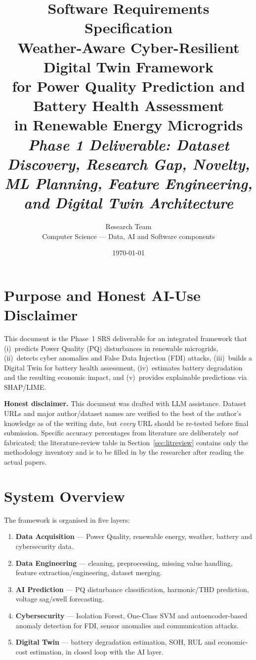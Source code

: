 \documentclass[11pt,a4paper]{article}
\title{
    \vspace{-2em}
    \textbf{Software Requirements Specification}\\[0.4em]
    \Large Weather-Aware Cyber-Resilient Digital Twin Framework\\
    \Large for Power Quality Prediction and Battery Health Assessment\\
    \Large in Renewable Energy Microgrids\\[0.6em]
    \normalsize \textit{Phase 1 Deliverable: Dataset Discovery, Research Gap,
    Novelty, ML Planning, Feature Engineering, and Digital Twin Architecture}
}
\author{Research Team \\ \small Computer Science --- Data, AI and Software components}
\date{\today}
\begin{document}
\maketitle

\section{Purpose and Honest AI-Use Disclaimer}

This document is the Phase~1 SRS deliverable for an integrated framework that
(i)~predicts Power Quality (PQ) disturbances in renewable microgrids,
(ii)~detects cyber anomalies and False Data Injection (FDI) attacks,
(iii)~builds a Digital Twin for battery health assessment,
(iv)~estimates battery degradation and the resulting economic impact, and
(v)~provides explainable predictions via SHAP/LIME.

\begin{tcolorbox}[colback=warnboxbg,colframe=warnboxbd,sharp corners,
boxrule=0.6pt,left=8pt,right=8pt,top=6pt,bottom=6pt]
\textbf{Honest disclaimer.} This document was drafted with LLM assistance.
Dataset URLs and major author/dataset names are verified to the best of the
author's knowledge as of the writing date, but \emph{every} URL should be
re-tested before final submission. Specific accuracy percentages from
literature are deliberately \emph{not} fabricated; the literature-review
table in Section~\ref{sec:litreview} contains only the methodology
inventory and is to be filled in by the researcher after reading the actual
papers.
\end{tcolorbox}

\section{System Overview}

The framework is organised in five layers:

\begin{enumerate}[leftmargin=1.4em]
    \item \textbf{Data Acquisition} --- Power Quality, renewable energy,
        weather, battery and cybersecurity data.
    \item \textbf{Data Engineering} --- cleaning, preprocessing, missing
        value handling, feature extraction/engineering, dataset merging.
    \item \textbf{AI Prediction} --- PQ disturbance classification,
        harmonic/THD prediction, voltage sag/swell forecasting.
    \item \textbf{Cybersecurity} --- Isolation Forest, One-Class SVM and
        autoencoder-based anomaly detection for FDI, sensor anomalies and
        communication attacks.
    \item \textbf{Digital Twin} --- battery degradation estimation, SOH,
        RUL and economic-cost estimation, in closed loop with the AI layer.
\end{enumerate}
\end{document}
